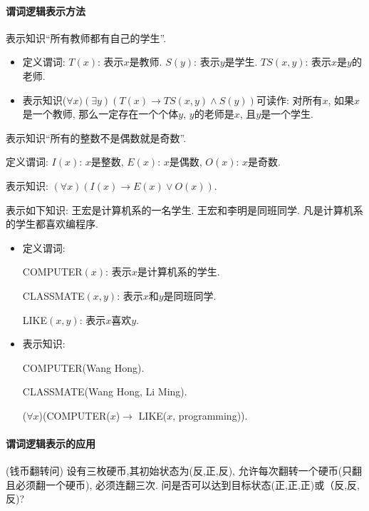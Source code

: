 \paragraph{谓词逻辑表示方法}
\begin{example}
表示知识“所有教师都有自己的学生”.
\begin{itemize}
\item  定义谓词: $T(x)$: 表示$x$是教师.
               $S (y)$: 表示$y$是学生.
               $TS(x, y)$: 表示$x$是$y$的老师.
\item  表示知识($\forall x)(\exists y)(T (x)\rightarrow TS(x, y) \wedge S (y))$可读作: 对所有$x$, 如果$x$是一个教师, 那么一定存在一个个体$y$, $y$的老师是$x$, 且$y$是一个学生.
\end{itemize}
\end{example}

\begin{example}
表示知识“所有的整数不是偶数就是奇数”.

定义谓词: $I(x)$: $x$是整数, $E(x)$: $x$是偶数,  $O(x)$: $x$是奇数.

表示知识: $(\forall x)(I(x) \rightarrow E(x)\vee O(x))$.
\end{example}

\begin{example}
表示如下知识: 王宏是计算机系的一名学生. 王宏和李明是同班同学. 凡是计算机系的学生都喜欢编程序.
\begin{itemize}
\item 定义谓词:

COMPUTER$(x)$: 表示$x$是计算机系的学生.

CLASSMATE$(x,y)$: 表示$x$和$y$是同班同学.

LIKE$(x,y)$: 表示$x$喜欢$y$.

\item 表示知识:

COMPUTER(Wang Hong).

CLASSMATE(Wang Hong, Li Ming).

($\forall x$)(COMPUTER($x$)$\rightarrow$ LIKE($x$, programming)).
\end{itemize}

\end{example}
\paragraph{谓词逻辑表示的应用}
\begin{example}(钱币翻转问)
设有三枚硬币,其初始状态为(反,正,反), 允许每次翻转一个硬币(只翻且必须翻一个硬币), 必须连翻三次. 问是否可以达到目标状态(正,正,正)或（反,反,反)?
\end{example}

